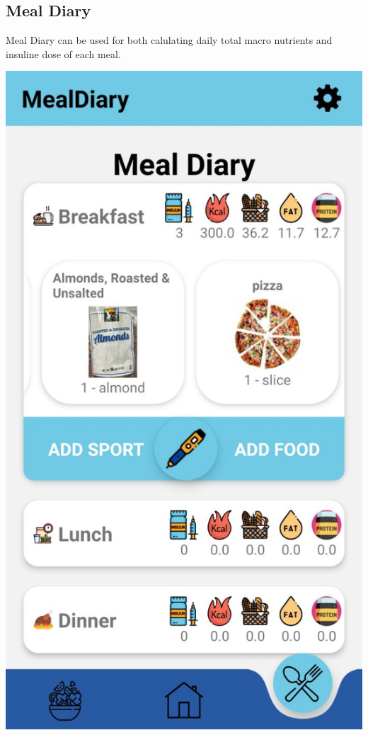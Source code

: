 \documentclass[12pt,hidelinks]{article}
\begin{document}
	\subsection{Meal Diary}
    Meal Diary can be used for both calulating daily total macro nutrients and insuline dose of each meal. 
	\begin{center}

		\includegraphics[scale=0.2]{screenshot5}
	\end{center}
\end{document}
